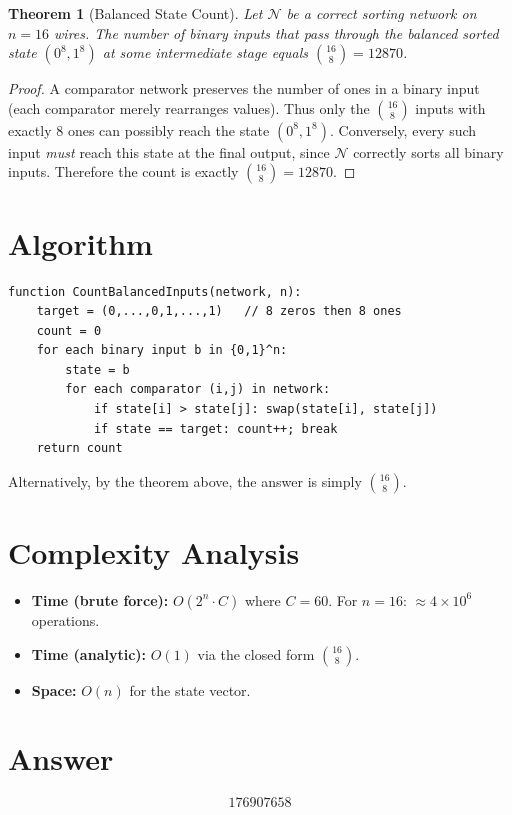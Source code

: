 \documentclass[11pt]{article}
\newtheorem{theorem}{Theorem}
\begin{document}
\begin{theorem}[Balanced State Count]
Let $\mathcal{N}$ be a correct sorting network on $n = 16$ wires. The number of binary inputs that pass through the balanced sorted state $(0^8, 1^8)$ at some intermediate stage equals $\binom{16}{8} = 12870$.
\end{theorem}

\begin{proof}
A comparator network preserves the number of ones in a binary input (each comparator merely rearranges values). Thus only the $\binom{16}{8}$ inputs with exactly 8 ones can possibly reach the state $(0^8, 1^8)$. Conversely, every such input \emph{must} reach this state at the final output, since $\mathcal{N}$ correctly sorts all binary inputs. Therefore the count is exactly $\binom{16}{8} = 12870$.
\end{proof}

\section{Algorithm}

\begin{verbatim}
function CountBalancedInputs(network, n):
    target = (0,...,0,1,...,1)   // 8 zeros then 8 ones
    count = 0
    for each binary input b in {0,1}^n:
        state = b
        for each comparator (i,j) in network:
            if state[i] > state[j]: swap(state[i], state[j])
            if state == target: count++; break
    return count
\end{verbatim}

Alternatively, by the theorem above, the answer is simply $\binom{16}{8}$.

\section{Complexity Analysis}

\begin{itemize}
\item \textbf{Time (brute force):} $O(2^n \cdot C)$ where $C = 60$. For $n=16$: $\approx 4 \times 10^6$ operations.
\item \textbf{Time (analytic):} $O(1)$ via the closed form $\binom{16}{8}$.
\item \textbf{Space:} $O(n)$ for the state vector.
\end{itemize}

\section{Answer}

\[
\boxed{176907658}
\]
\end{document}
